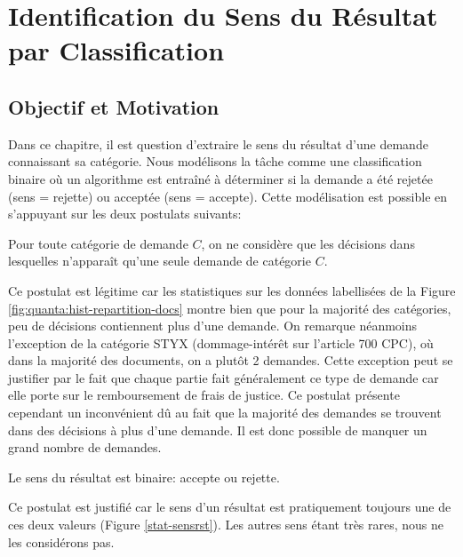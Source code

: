 \chapter{Identification du Sens du Résultat par Classification}
\label{sec:sensresultat}

\section{Objectif et Motivation}
\label{sec:sensresultat:motivation}
Dans ce chapitre, il est question d'extraire le sens du résultat d'une demande connaissant sa catégorie. Nous modélisons la tâche comme une classification binaire où un algorithme est entraîné à déterminer si la demande a été rejetée (sens = rejette) ou acceptée (sens = accepte). Cette modélisation est possible en s'appuyant sur les deux postulats suivants:

\begin{postulat}
Pour toute catégorie de demande $C$, on ne considère que les décisions dans lesquelles n'apparaît qu'une seule demande de catégorie $C$.
\end{postulat} 
Ce postulat est légitime car les statistiques sur les données labellisées de la Figure \ref{fig:quanta:hist-repartition-docs} montre bien que pour la majorité des catégories, peu de décisions contiennent plus d'une demande. On remarque néanmoins l'exception de la catégorie STYX (dommage-intérêt sur l'article 700 CPC), où dans la majorité des documents, on a plutôt 2 demandes. Cette exception peut se justifier par le fait que chaque partie fait généralement ce type de demande car elle porte sur le remboursement de frais de justice. Ce postulat présente cependant un inconvénient dû au fait que la majorité des demandes se trouvent dans des décisions à plus d'une demande. Il est donc possible de manquer un grand nombre de demandes. %

\begin{postulat}
Le sens du résultat est binaire: accepte ou rejette.
\end{postulat} 
Ce postulat est justifié car le sens d'un résultat est pratiquement toujours une de ces deux valeurs (Figure \ref{stat-sensrst}). Les autres sens étant très rares, nous ne les considérons pas.

